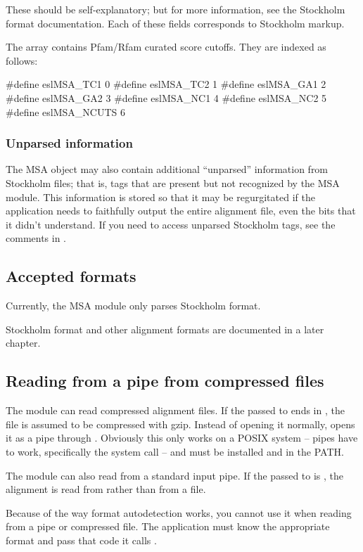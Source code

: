 These should be self-explanatory; but for more information, see the
Stockholm format documentation. Each of these fields corresponds to
Stockholm markup.

The  array contains Pfam/Rfam curated score
cutoffs. They are indexed as follows:

\begin{cchunk}
#define eslMSA_TC1     0
#define eslMSA_TC2     1
#define eslMSA_GA1     2
#define eslMSA_GA2     3
#define eslMSA_NC1     4
#define eslMSA_NC2     5
#define eslMSA_NCUTS   6
\end{cchunk}

\subsubsection{Unparsed information}

The MSA object may also contain additional ``unparsed'' information
from Stockholm files; that is, tags that are present but not
recognized by the MSA module. This information is stored so that it
may be regurgitated if the application needs to faithfully output the
entire alignment file, even the bits that it didn't understand. If you
need to access unparsed Stockholm tags, see the comments in
.


\subsection{Accepted formats}

Currently, the MSA module only parses Stockholm format. 

Stockholm format and other alignment formats are documented in a later
chapter.

\subsection{Reading from a pipe from compressed files}

The module can read compressed alignment files.  If the
 passed to  ends in
, the file is assumed to be compressed with gzip. Instead
of opening it normally,  opens it as a pipe
through . Obviously this only works on a POSIX
system -- pipes have to work, specifically the  system
call -- and  must be installed and in the PATH.

The module can also read from a standard input pipe. If the
 passed to  is \ccode{-},
the alignment is read from  rather than from a file.

Because of the way format autodetection works, you cannot use it when
reading from a pipe or compressed file. The application must know the
appropriate format and pass that code it calls
.
